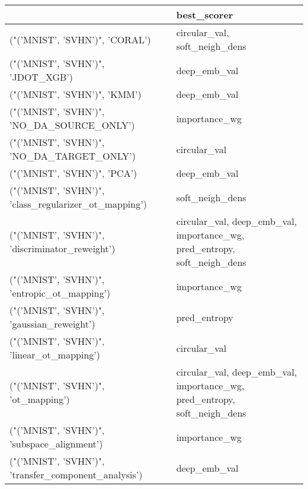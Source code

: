 \begin{tabular}{ll}
\hline
                                                       & best\_scorer                                                              \\
\hline
 ("('MNIST', 'SVHN')", 'CORAL')                        & circular\_val, soft\_neigh\_dens                                            \\
 ("('MNIST', 'SVHN')", 'JDOT\_XGB')                     & deep\_emb\_val                                                             \\
 ("('MNIST', 'SVHN')", 'KMM')                          & deep\_emb\_val                                                             \\
 ("('MNIST', 'SVHN')", 'NO\_DA\_SOURCE\_ONLY')            & importance\_wg                                                            \\
 ("('MNIST', 'SVHN')", 'NO\_DA\_TARGET\_ONLY')            & circular\_val                                                             \\
 ("('MNIST', 'SVHN')", 'PCA')                          & deep\_emb\_val                                                             \\
 ("('MNIST', 'SVHN')", 'class\_regularizer\_ot\_mapping') & soft\_neigh\_dens                                                          \\
 ("('MNIST', 'SVHN')", 'discriminator\_reweight')       & circular\_val, deep\_emb\_val, importance\_wg, pred\_entropy, soft\_neigh\_dens \\
 ("('MNIST', 'SVHN')", 'entropic\_ot\_mapping')          & importance\_wg                                                            \\
 ("('MNIST', 'SVHN')", 'gaussian\_reweight')            & pred\_entropy                                                             \\
 ("('MNIST', 'SVHN')", 'linear\_ot\_mapping')            & circular\_val                                                             \\
 ("('MNIST', 'SVHN')", 'ot\_mapping')                   & circular\_val, deep\_emb\_val, importance\_wg, pred\_entropy, soft\_neigh\_dens \\
 ("('MNIST', 'SVHN')", 'subspace\_alignment')           & importance\_wg                                                            \\
 ("('MNIST', 'SVHN')", 'transfer\_component\_analysis')  & deep\_emb\_val                                                             \\

\end{tabular}
